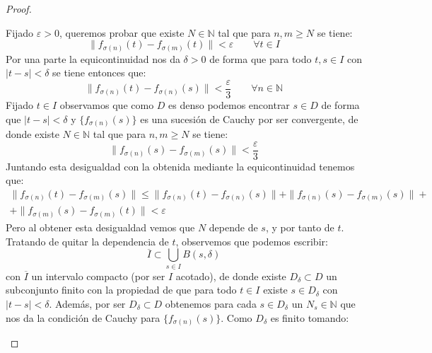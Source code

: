 \begin{teo}
\begin{proof}
\begin{enumerate}
                Fijado $\varepsilon>0$, queremos probar que existe $N\in \mathbb{N}$ tal que para $n,m\geq N$ se tiene:
                \begin{equation*}
                    \|f_{\sigma(n)}(t) - f_{\sigma(m)}(t)\| < \varepsilon \qquad \forall t\in I
                \end{equation*}
                Por una parte la equicontinuidad nos da $\delta>0$ de forma que para todo $t,s\in I$ con $|t-s|<\delta$ se tiene entonces que:
                \begin{equation*}
                    \|f_{\sigma(n)}(t) - f_{\sigma(n)}(s)\| < \frac{\varepsilon}{3} \qquad \forall n\in \mathbb{N}
                \end{equation*}
                Fijado $t\in I$ observamos que como $D$ es denso podemos encontrar $s\in D$ de forma que $|t-s|<\delta$ y $\{f_{\sigma(n)}(s)\}$ es una sucesión de Cauchy por ser convergente, de donde existe $N\in \mathbb{N}$ tal que para $n,m\geq N$ se tiene:
                \begin{equation*}
                    \|f_{\sigma(n)}(s) - f_{\sigma(m)}(s)\| < \frac{\varepsilon}{3}
                \end{equation*}
                Juntando esta desigualdad con la obtenida mediante la equicontinuidad tenemos que:
                \begin{multline*}
                    \|f_{\sigma(n)}(t) - f_{\sigma(m)}(s)\| \leq \|f_{\sigma(n)}(t) - f_{\sigma(n)}(s)\| + \|f_{\sigma(n)}(s) - f_{\sigma(m)}(s)\| + \\ + \|f_{\sigma(m)}(s) - f_{\sigma(m)}(t)\| < \varepsilon
                \end{multline*}
                Pero al obtener esta desigualdad vemos que $N$ depende de $s$, y por tanto de $t$. Tratando de quitar la dependencia de $t$, observemos que podemos escribir:
                \begin{equation*}
                    \overline{I} \subset \bigcup_{s\in I}B(s,\delta)
                \end{equation*}
                con $\overline{I}$ un intervalo compacto (por ser $I$ acotado), de donde existe $D_\delta\subset D$ un subconjunto finito con la propiedad de que para todo $t\in I$ existe $s\in D_\delta$ con $|t-s|<\delta$. Además, por ser $D_\delta\subset D$ obtenemos para cada $s\in D_\delta$ un $N_s\in \mathbb{N}$ que nos da la condición de Cauchy para $\{f_{\sigma(n)}(s)\}$. Como $D_\delta$ es finito tomando:
                \begin{equation*}

\end{equation*}
\end{enumerate}
\end{proof}
\end{teo}
